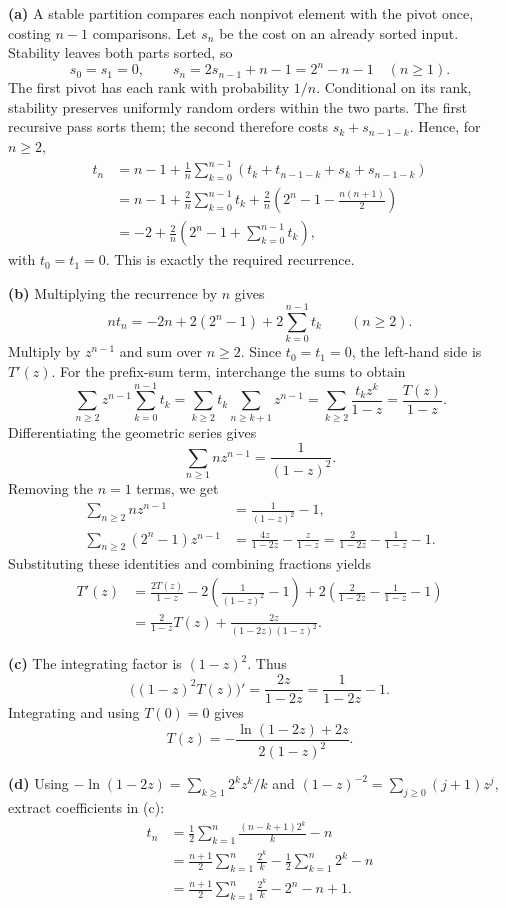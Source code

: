 \documentclass[11pt]{article}
\begin{document}
\textbf{(a)} A stable partition compares each nonpivot element with the
pivot once, costing $n-1$ comparisons. Let $s_n$ be the
cost on an already sorted input. Stability leaves both parts sorted, so
\[
s_0=s_1=0,\qquad s_n=2s_{n-1}+n-1=2^n-n-1\quad(n\geq 1).
\]
The first pivot has each rank with probability $1/n$. Conditional on its
rank, stability preserves uniformly random orders within the two parts.
The first recursive pass sorts them; the second therefore costs
$s_k+s_{n-1-k}$. Hence, for $n\geq2$,
\begin{align*}
t_n&=n-1+\frac1n\sum_{k=0}^{n-1}
       (t_k+t_{n-1-k}+s_k+s_{n-1-k})\\
&=n-1+\frac2n\sum_{k=0}^{n-1}t_k
 +\frac2n\left(2^n-1-\frac{n(n+1)}2\right)\\
&=-2+\frac2n\left(2^n-1+\sum_{k=0}^{n-1}t_k\right),
\end{align*}
with $t_0=t_1=0$.
This is exactly the required recurrence.

\textbf{(b)} Multiplying the recurrence by $n$ gives
\[
nt_n=-2n+2(2^n-1)+2\sum_{k=0}^{n-1}t_k
\qquad(n\geq2).
\]
Multiply by $z^{n-1}$ and sum over $n\geq2$. Since $t_0=t_1=0$,
the left-hand side is $T'(z)$. For the prefix-sum term, interchange
the sums to obtain
\[
\sum_{n\geq2}z^{n-1}\sum_{k=0}^{n-1}t_k
=\sum_{k\geq2}t_k\sum_{n\geq k+1}z^{n-1}
=\sum_{k\geq2}\frac{t_kz^k}{1-z}
=\frac{T(z)}{1-z}.
\]
Differentiating the geometric series gives
\[
\sum_{n\geq1}nz^{n-1}=\frac1{(1-z)^2}.
\]
Removing the $n=1$ terms, we get
\begin{align*}
\sum_{n\geq2}nz^{n-1}
&=\frac1{(1-z)^2}-1,\\
\sum_{n\geq2}(2^n-1)z^{n-1}
&=\frac{4z}{1-2z}-\frac{z}{1-z}
=\frac2{1-2z}-\frac1{1-z}-1.
\end{align*}
Substituting these identities and combining fractions yields
\begin{align*}
T'(z)&=\frac{2T(z)}{1-z}
 -2\left(\frac1{(1-z)^2}-1\right)
 +2\left(\frac2{1-2z}-\frac1{1-z}-1\right)\\
&=\frac{2}{1-z}T(z)+\frac{2z}{(1-2z)(1-z)^2}.
\end{align*}

\textbf{(c)} The integrating factor is $(1-z)^2$. Thus
\[
\bigl((1-z)^2T(z)\bigr)'
=\frac{2z}{1-2z}=\frac1{1-2z}-1.
\]
Integrating and using $T(0)=0$ gives
\[
\boxed{T(z)=-\frac{\ln(1-2z)+2z}{2(1-z)^2}.}
\]

\textbf{(d)} Using $-\ln(1-2z)=\sum_{k\geq1}2^kz^k/k$ and
$(1-z)^{-2}=\sum_{j\geq0}(j+1)z^j$, extract coefficients in (c):
\begin{align*}
t_n
&=\frac12\sum_{k=1}^n\frac{(n-k+1)2^k}{k}-n\\
&=\frac{n+1}{2}\sum_{k=1}^n\frac{2^k}{k}
 -\frac12\sum_{k=1}^n2^k-n\\
&=\boxed{\frac{n+1}{2}\sum_{k=1}^n\frac{2^k}{k}-2^n-n+1.}
\end{align*}
\end{document}
